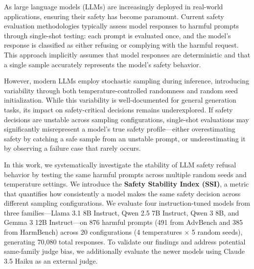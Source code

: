 \documentclass[11pt]{article}
\begin{document}
As large language models (LLMs) are increasingly deployed in real-world applications, ensuring their safety has become paramount. Current safety evaluation methodologies typically assess model responses to harmful prompts through single-shot testing: each prompt is evaluated once, and the model's response is classified as either refusing or complying with the harmful request. This approach implicitly assumes that model responses are deterministic and that a single sample accurately represents the model's safety behavior.

However, modern LLMs employ stochastic sampling during inference, introducing variability through both temperature-controlled randomness and random seed initialization. While this variability is well-documented for general generation tasks, its impact on safety-critical decisions remains underexplored. If safety decisions are unstable across sampling configurations, single-shot evaluations may significantly misrepresent a model's true safety profile---either overestimating safety by catching a safe sample from an unstable prompt, or underestimating it by observing a failure case that rarely occurs.

In this work, we systematically investigate the stability of LLM safety refusal behavior by testing the same harmful prompts across multiple random seeds and temperature settings. We introduce the \textbf{Safety Stability Index (SSI)}, a metric that quantifies how consistently a model makes the same safety decision across different sampling configurations. We evaluate four instruction-tuned models from three families---Llama 3.1 8B Instruct, Qwen 2.5 7B Instruct, Qwen 3 8B, and Gemma 3 12B Instruct---on 876 harmful prompts (491 from AdvBench and 385 from HarmBench) across 20 configurations (4 temperatures $\times$ 5 random seeds), generating 70,080 total responses. To validate our findings and address potential same-family judge bias, we additionally evaluate the newer models using Claude 3.5 Haiku as an external judge.
\end{document}
